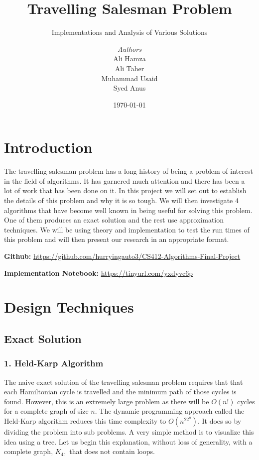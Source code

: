 \documentclass[12pt]{report}
\institute{Habib University}
\title{Travelling Salesman Problem}
\subtitle{Implementations and Analysis of Various Solutions}
\author{\textit{Authors}\\
            Ali Hamza \\
            Ali Taher \\
            Muhammad Usaid \\
            Syed Anus}
\date{\today}
\begin{document}
    \maketitle
    \romantableofcontents

\chapter{Introduction}
The travelling salesman problem has a long history of being a problem of interest in the field of algorithms. It has garnered much attention and there has been a lot of work that has been done on it. In this project we will set out to establish the details of this problem and why it is so tough. We will then investigate 4 algorithms that have become well known in being useful for solving this problem. One of them produces an exact solution and the rest use approximation techniques. We will be using theory and implementation to test the run times of this problem and will then present our research in an appropriate format.\par
\textbf{Github:} \url{https://github.com/hurryingauto3/CS412-Algorithms-Final-Project}\par
\textbf{Implementation Notebook:} \url{https://tinyurl.com/yxdyvc6p}
\chapter{Design Techniques}
  \section{Exact Solution}
  
\subsection{1. Held-Karp Algorithm}
The naive exact solution of the travelling salesman problem requires that that each Hamiltonian cycle is travelled and the minimum path of those cycles is found. However, this is an extremely large problem as there will be $O(n!)$ cycles for a complete graph of size $n$. The dynamic programming approach called the Held-Karp algorithm reduces this time complexity to $O(n^22^n)$. It does so by dividing the problem into sub problems.  A very simple method is to visualize this idea using a tree.
  Let us begin this explanation, without loss of generality, with a complete graph, $K_4,$ that does not contain loops. 
\end{document}
